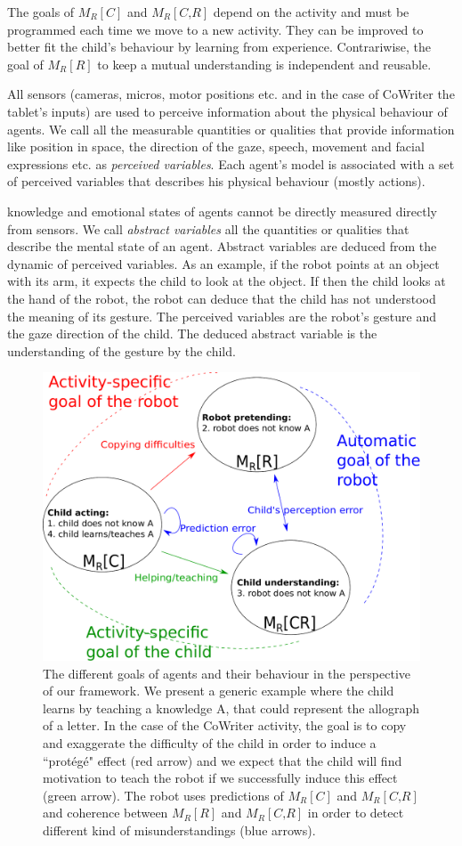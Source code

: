 \documentclass[10pt,a4paper]{article}
\begin{document}
The goals of $ M_R\left[\textit{C}\right]$ and $ M_R\left[\textit{C,R}\right]$ depend on the activity and must be programmed each time we move to a new activity. They can be improved to better fit the child's behaviour by learning from experience. Contrariwise, the goal of $ M_R\left[\textit{R}\right]$ to keep a mutual understanding is independent and reusable. 

All sensors (cameras, micros, motor positions etc. and in the case of CoWriter the tablet's inputs) are used to perceive information about the physical behaviour of agents. 
We call all the measurable quantities or qualities that provide information like position in space, the direction of the gaze, speech, movement and facial expressions etc. as \textit{perceived variables}. 
Each agent's model is associated with a set of perceived variables that describes his physical behaviour (mostly actions).

knowledge and emotional states of agents cannot be directly measured directly from sensors. 
We call \textit{abstract variables} all the quantities or qualities that describe the mental state of an agent. 
Abstract variables are deduced from the dynamic of perceived variables. 
As an example, if the robot points at an object with its arm, it expects the child to look at the object. 
If then the child looks at the hand of the robot, the robot can deduce that the child has not understood the meaning of its gesture. 
The perceived variables are the robot's gesture and the gaze direction of the child. 
The deduced abstract variable is the understanding of the gesture by the child. 


\begin{figure}[!]
\centering
\includegraphics[width=0.6\columnwidth]{mutual_behaviour}
\caption{\small The different goals of agents and their behaviour in the perspective of our framework. We present a generic example where the child learns by teaching a knowledge A, that could represent the allograph of a letter. In the case of the CoWriter activity, the goal is to copy and exaggerate the difficulty of the child in order to induce a ``prot\'eg\'e" effect (red arrow) and we expect that the child will find motivation to teach the robot if we successfully induce this effect (green arrow). The robot uses predictions of $ M_R\left[\textit{C}\right]$ and $ M_R\left[\textit{C,R}\right]$ and coherence between $ M_R\left[\textit{R}\right]$ and $ M_R\left[\textit{C,R}\right]$ in order to detect different kind of misunderstandings (blue arrows).}
\label{mm}
\end{figure} 
\end{document}
